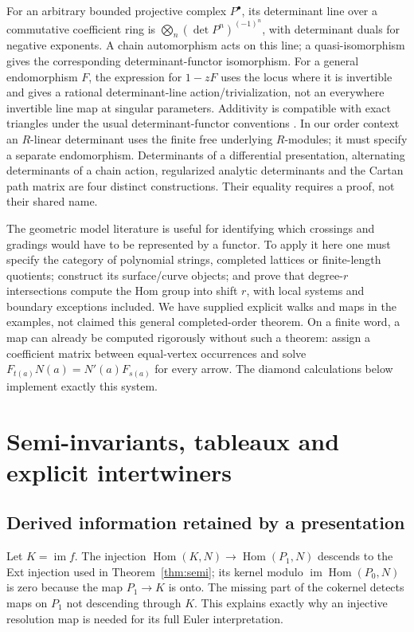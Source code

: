 \documentclass[11pt]{article}
\theoremstyle{definition}\newtheorem{definition}[theorem]{Definition}
\theoremstyle{remark}\newtheorem{remark}[theorem]{Remark}
\begin{document}
For an arbitrary bounded projective complex $P^\bullet$, its determinant line over a commutative coefficient ring is $\bigotimes_n(\det P^n)^{(-1)^n}$, with determinant duals for negative exponents. A chain automorphism acts on this line; a quasi-isomorphism gives the corresponding determinant-functor isomorphism. For a general endomorphism $F$, the expression for $1-zF$ uses the locus where it is invertible and gives a rational determinant-line action/trivialization, not an everywhere invertible line map at singular parameters. Additivity is compatible with exact triangles under the usual determinant-functor conventions \cite{KnudsenMumford,Breuning}. In our order context an $R$-linear determinant uses the finite free underlying $R$-modules; it must specify a separate endomorphism. Determinants of a differential presentation, alternating determinants of a chain action, regularized analytic determinants and the Cartan path matrix are four distinct constructions. Their equality requires a proof, not their shared name.

The geometric model literature \cite{GeometricGentle,GeometricResolutions,GeometricKoszul} is useful for identifying which crossings and gradings would have to be represented by a functor. To apply it here one must specify the category of polynomial strings, completed lattices or finite-length quotients; construct its surface/curve objects; and prove that degree-$r$ intersections compute the Hom group into shift $r$, with local systems and boundary exceptions included. We have supplied explicit walks and maps in the examples, not claimed this general completed-order theorem. On a finite word, a map can already be computed rigorously without such a theorem: assign a coefficient matrix between equal-vertex occurrences and solve $F_{t(a)}N(a)=N'(a)F_{s(a)}$ for every arrow. The diamond calculations below implement exactly this system.

\section{Semi-invariants, tableaux and explicit intertwiners}
\subsection{Derived information retained by a presentation}
Let $K=\operatorname{im}f$. The injection $\operatorname{Hom}(K,N)\to\operatorname{Hom}(P_1,N)$ descends to the Ext injection used in Theorem~\ref{thm:semi}; its kernel modulo $\operatorname{im}\operatorname{Hom}(P_0,N)$ is zero because the map $P_1\to K$ is onto. The missing part of the cokernel detects maps on $P_1$ not descending through $K$. This explains exactly why an injective resolution map is needed for its full Euler interpretation.
\end{document}
